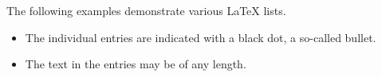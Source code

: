 \documentclass{article}
\begin{document}
	The following examples demonstrate various \LaTeX{} lists.
	
	\begin{itemize}
		\item The individual entries are indicated with a black dot, a so-called bullet.
		\item The text in the entries may be of any length.
	\end{itemize}
\end{document}

